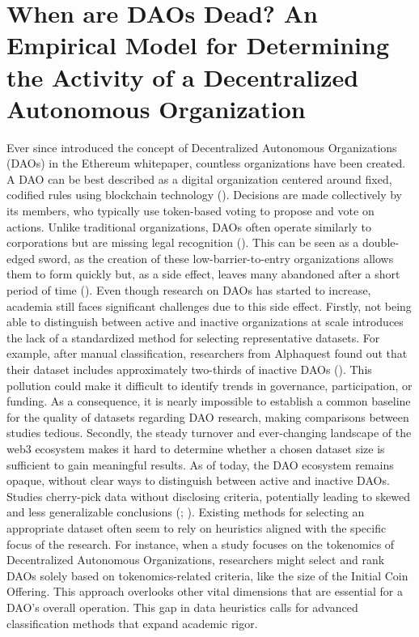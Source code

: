 \chapter[Introduction]{When are DAOs Dead? An Empirical Model for Determining the Activity of a Decentralized Autonomous Organization}

Ever since \textcite{buterin2013ethereum} introduced the concept of Decentralized Autonomous Organizations (DAOs) in the Ethereum whitepaper, countless organizations have been created.
A DAO can be best described as a digital organization centered around fixed, codified rules using blockchain technology (\cite{el2020overview}).
Decisions are made collectively by its members, who typically use token-based voting to propose and vote on actions.
%
Unlike traditional organizations, DAOs often operate similarly to corporations but are missing legal recognition (\cite{wright2015decentralized}).
This can be seen as a double-edged sword, as the creation of these low-barrier-to-entry organizations allows them to form quickly but, as a side effect, leaves many abandoned after a short period of time (\cite{alphaquest2024dead}).
Even though research on DAOs has started to increase, academia still faces significant challenges due to this side effect.
Firstly, not being able to distinguish between active and inactive organizations at scale introduces the lack of a standardized method for selecting representative datasets.
For example, after manual classification, researchers from Alphaquest found out that their dataset includes approximately two-thirds of inactive DAOs (\cite{alphaquest2024dead}).
This pollution could make it difficult to identify trends in governance, participation, or funding.
As a consequence, it is nearly impossible to establish a common baseline for the quality of datasets regarding DAO research, making comparisons between studies tedious.
Secondly, the steady turnover and ever-changing landscape of the web3 ecosystem makes it hard to determine whether a chosen dataset size is sufficient to gain meaningful results.
As of today, the DAO ecosystem remains opaque, without clear ways to distinguish between active and inactive DAOs.
Studies cherry-pick data without disclosing criteria, potentially leading to skewed and less generalizable conclusions (\cite{faqir2021comparative}; \cite{monteiro2024exploring}).
Existing methods for selecting an appropriate dataset often seem to rely on heuristics aligned with the specific focus of the research. For instance, when a study focuses on the tokenomics of Decentralized Autonomous Organizations, researchers might select and rank DAOs solely based on tokenomics-related criteria, like the size of the Initial Coin Offering. This approach overlooks other vital dimensions that are essential for a DAO's overall operation.
This gap in data heuristics calls for advanced classification methods that expand academic rigor.

